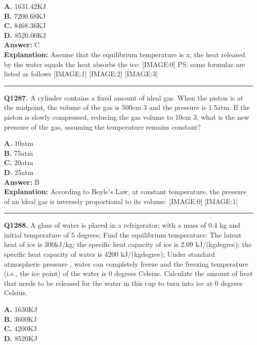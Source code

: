 \documentclass[12pt]{article}
\begin{document}
\textbf{A.} 1631.42KJ \\
\textbf{B.} 7200.68KJ \\
\textbf{C.} 8468.36KJ \\
\textbf{D.} 8520.00KJ \\

\textbf{Answer:} C \\
\textbf{Explanation:} Assume that the equilibrium temperature is x; the heat released by the water equals the heat absorbs the ice:
[IMAGE:0]
PS: some formulas are listed as follows
[IMAGE:1]
[IMAGE:2]
[IMAGE:3]

\hrule
\vspace{1em}


\noindent
\textbf{Q1287.} A cylinder contains a fixed amount of ideal gas. When the piston is at the midpoint, the volume of the gas is 500cm
3
and the pressure is 1.5atm. If the piston is slowly compressed, reducing the gas volume to 10cm
3,
what is the new pressure of the gas, assuming the temperature remains constant?



\textbf{A.} 10atm \\
\textbf{B.} 75atm \\
\textbf{C.} 20atm \\
\textbf{D.} 25atm \\

\textbf{Answer:} B \\
\textbf{Explanation:} According to Boyle's Law, at constant temperature, the pressure of an ideal gas is inversely proportional to its volume:
[IMAGE:0]
[IMAGE:1]

\hrule
\vspace{1em}


\noindent
\textbf{Q1288.} A glass of water is placed in a refrigerator; with a mass of 0.4 kg and initial temperature of 5 degrees; Find the equilibrium temperature: The latent heat of ice is 300kJ/kg; the specific heat capacity of ice is 2.09 kJ/(kg\cdot degree); the specific heat capacity of water is 4200 kJ/(kg\cdot degree); Under standard atmospheric pressure , water can completely freeze and the freezing temperature (i.e., the ice point) of the water is 0 degrees Celsius.
Calculate the amount of heat that needs to be released for the water in this cup to turn into ice at 0 degrees Celsius.



\textbf{A.} 1630KJ \\
\textbf{B.} 3600KJ \\
\textbf{C.} 4200KJ \\
\textbf{D.} 8520KJ \\
\end{document}
